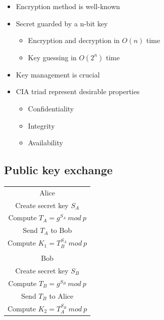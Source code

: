 \begin{multicols}{2}
\begin{itemize}
\item Encryption method is well-known
\item Secret guarded by a n-bit key
  \begin{itemize}
    \item Encryption and decryption in $O(n)$ time
    \item Key guessing in $O(2^n)$ time
  \end{itemize}
\item Key management is crucial
\item CIA triad represent desirable properties
  \begin{itemize}
  \item Confidentiality
  \item Integrity
  \item Availability
  \end{itemize}
\end{itemize}

\subsection{Public key exchange}
\begin{center}
\begin{tabular}{ c }
  Alice \\
  Create secret key $S_A$  \\
  Compute $T_A=g^{S_A} \: mod \: p$  \\
  Send $T_A$ to Bob  \\
  Compute $K_1=T_B^{S_A} \: mod \: p$  \\
  \\
  Bob \\
  Create secret key $S_B$ \\
  Compute $T_B=g^{S_B} \: mod \: p$ \\
  Send $T_B$ to Alice \\
  Compute $K_2=T_A^{S_B} \: mod \: p$
\end{tabular}
\end{center}


\end{multicols}
